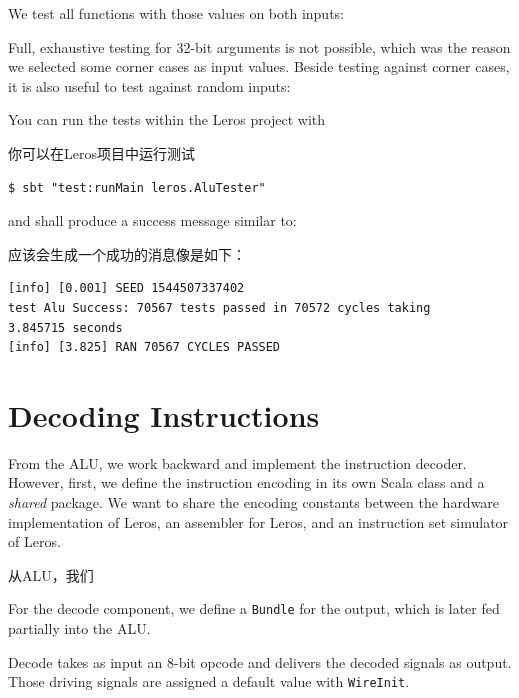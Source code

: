 \documentclass[%
    10pt,
    headinclude, footexclude,
    openright, %
    notitlepage,
    cleardoubleempty,
    headsepline,
    pointlessnumbers,
    bibtotoc, idxtotoc,
    ]{scrbook}
\newcommand{\code}[1]{{\small{\texttt{#1}}}}
\newcommand{\todo}[1]{{\emph{TODO: #1}}}
\renewcommand{\todo}[1]{}
\begin{document}
\noindent We test all functions with those values on both inputs:


\noindent Full, exhaustive testing for 32-bit arguments is not possible, which was the reason we
selected some corner cases as input values. Beside testing against corner cases, it is also useful
to test against random inputs:


\noindent You can run the tests within the Leros project with

\noindent 你可以在Leros项目中运行测试

\begin{verbatim}
$ sbt "test:runMain leros.AluTester"
\end{verbatim}

and shall produce a success message similar to:

应该会生成一个成功的消息像是如下：

\begin{verbatim}
[info] [0.001] SEED 1544507337402
test Alu Success: 70567 tests passed in 70572 cycles taking
3.845715 seconds
[info] [3.825] RAN 70567 CYCLES PASSED
\end{verbatim}

\section{Decoding Instructions}

From the ALU, we work backward and implement the instruction decoder.
However, first, we define the instruction encoding in its own Scala class and
a \emph{shared} package. We want to share the encoding constants between
the hardware implementation of Leros, an assembler for Leros, and an instruction
set simulator of Leros.

从ALU，我们


\todo{Update code when Leros is more complete, as stuff is missing.}

\noindent For the decode component, we define a \code{Bundle} for the output,
which is later fed partially into the ALU.


\noindent Decode takes as input an 8-bit opcode and delivers the decoded signals
as output. Those driving signals are assigned a default value with \code{WireInit}.
\end{document}
